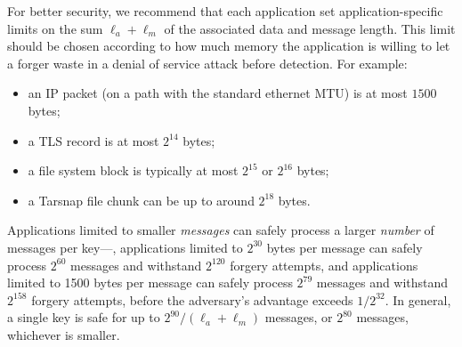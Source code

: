 \documentclass[draft]{article}
\DeclareRobustCommand{\operatorsc}[1]{{%
  \ifmmode\let\next=\operatorname\else\let\next=\relax\fi\next{\textsc{#1}}}}
\def\Daence/{\operatorsc{Daence}}
\begin{document}
For better security, we recommend that each application set
 application-specific limits on the sum $\ell_a + \ell_m$ of the
 associated data and message length.
This limit should be chosen according to how much memory the
 application is willing to let a forger waste in a denial of service
 attack before detection.
For example:
\begin{itemize}
  \item an IP packet (on a path with the standard ethernet MTU)
     is at most $1500$ bytes;
  \item a TLS record is at most $2^{14}$ bytes;
  \item a file system block is typically at most $2^{15}$ or $2^{16}$ bytes;
  \item a Tarsnap file chunk can be up to around $2^{18}$ bytes.
\end{itemize}
Applications limited to smaller \emph{messages} can safely process a
 larger \emph{number} of messages per key---\eg, applications limited
 to $2^{30}$ bytes per message can safely process $2^{60}$ messages and
 withstand $2^{120}$ forgery attempts, and applications limited to 1500
 bytes per message can safely process $2^{79}$ messages and withstand
 $2^{158}$ forgery attempts, before the adversary's advantage exceeds
 $1/2^{32}$.
In general, a single \Daence/ key is safe for up to
 $2^{90}\!/(\ell_a + \ell_m)$
 messages, or $2^{80}$ messages, whichever is smaller.
\end{document}
